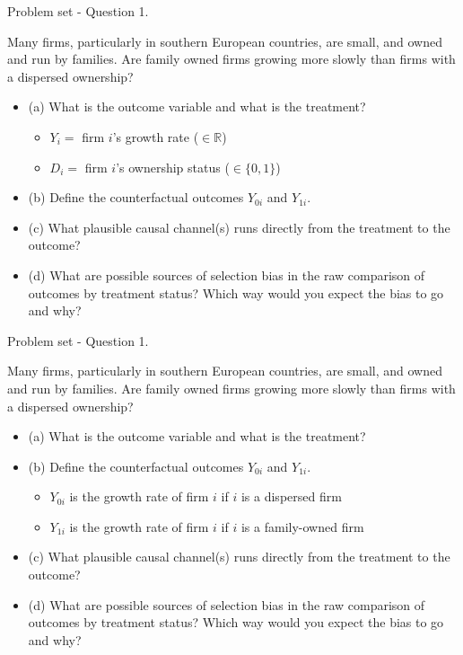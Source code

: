 \documentclass[aspectratio=169, 11pt]{beamer}
\begin{document}
\begin{frame}{Problem set - Question 1.}

Many firms, particularly in southern European countries, are small, and \alert{owned and run by families}. 
Are family owned firms \alert{growing more slowly} than firms with a dispersed ownership?

\begin{itemize}
    \item \alert{(a) What is the outcome variable and what is the treatment?}
    \begin{itemize}
        \item \alert{$Y_i = $ firm $i$'s growth rate ($\in \mathbb{R}$)}
        \item \alert{$D_i =$ firm $i$'s ownership status ($\in \{0, 1\}$)}
    \end{itemize}
    \item (b) Define the counterfactual outcomes $Y_{0i}$ and $Y_{1i}$.
    \item (c) What plausible causal channel(s) runs directly from the treatment to the outcome?
    \item (d) What are possible sources of selection bias in the raw comparison of outcomes by treatment status? Which way would you expect the bias to go and why?
\end{itemize}

\end{frame}

\begin{frame}{Problem set - Question 1.}

Many firms, particularly in southern European countries, are small, and owned and run by families. 
Are family owned firms growing more slowly than firms with a dispersed ownership?

\begin{itemize}
    \item (a) What is the outcome variable and what is the treatment?
    \item \alert{(b) Define the counterfactual outcomes $Y_{0i}$ and $Y_{1i}$.}
    \begin{itemize}
        \item \alert{$Y_{0i}$ is the growth rate of firm $i$ if $i$ is a dispersed firm}
        \item \alert{$Y_{1i}$ is the growth rate of firm $i$ if $i$ is a family-owned firm}
    \end{itemize}
    \item (c) What plausible causal channel(s) runs directly from the treatment to the outcome?
    \item (d) What are possible sources of selection bias in the raw comparison of outcomes by treatment status? Which way would you expect the bias to go and why?
\end{itemize}

\end{frame}
\end{document}
